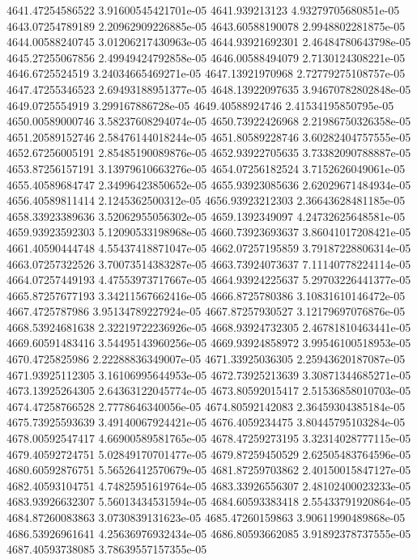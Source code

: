 {4641.47254586522 3.91600545421701e-05
4641.939213123 4.93279705680851e-05
4643.07254789189 2.20962909226885e-05
4643.60588190078 2.9948802281875e-05
4644.00588240745 3.01206217430963e-05
4644.93921692301 2.46484780643798e-05
4645.27255067856 2.49949424792858e-05
4646.00588494079 2.7130124308221e-05
4646.6725524519 3.24034665469271e-05
4647.13921970968 2.72779275108757e-05
4647.47255346523 2.69493188951377e-05
4648.13922097635 3.94670782802848e-05
4649.0725554919 3.299167886728e-05
4649.40588924746 2.41534195850795e-05
4650.00589000746 3.58237608294074e-05
4650.73922426968 2.21986750326358e-05
4651.20589152746 2.58476144018244e-05
4651.80589228746 3.60282404757555e-05
4652.67256005191 2.85485190089876e-05
4652.93922705635 3.73382090788887e-05
4653.87256157191 3.13979610663276e-05
4654.07256182524 3.7152626049061e-05
4655.40589684747 2.34996423850652e-05
4655.93923085636 2.62029671484934e-05
4656.40589811414 2.1245362500312e-05
4656.93923212303 2.36643628481185e-05
4658.33923389636 3.52062955056302e-05
4659.1392349097 4.24732625648581e-05
4659.93923592303 5.12090533198968e-05
4660.73923693637 3.86041017208421e-05
4661.40590444748 4.55437418871047e-05
4662.07257195859 3.79187228806314e-05
4663.07257322526 3.70073514383287e-05
4663.73924073637 7.11140778224114e-05
4664.07257449193 4.47553973717667e-05
4664.93924225637 5.29703226441377e-05
4665.87257677193 3.34211567662416e-05
4666.8725780386 3.10831610146472e-05
4667.4725787986 3.95134789227924e-05
4667.87257930527 3.12179697076876e-05
4668.53924681638 2.32219722236926e-05
4668.93924732305 2.46781810463441e-05
4669.60591483416 3.54495143960256e-05
4669.93924858972 3.99546100518953e-05
4670.4725825986 2.22288836349007e-05
4671.33925036305 2.25943620187087e-05
4671.93925112305 3.16106995644953e-05
4672.73925213639 3.30871344685271e-05
4673.13925264305 2.64363122045774e-05
4673.80592015417 2.51536858010703e-05
4674.47258766528 2.7778646340056e-05
4674.80592142083 2.36459304385184e-05
4675.73925593639 3.49140067924421e-05
4676.4059234475 3.80445795103284e-05
4678.00592547417 4.66900589581765e-05
4678.47259273195 3.32314028777115e-05
4679.40592724751 5.02849170701477e-05
4679.87259450529 2.62505483764596e-05
4680.60592876751 5.56526412570679e-05
4681.87259703862 2.40150015847127e-05
4682.40593104751 4.74825951619764e-05
4683.33926556307 2.48102400023233e-05
4683.93926632307 5.56013434531594e-05
4684.60593383418 2.55433791920864e-05
4684.87260083863 3.0730839131623e-05
4685.47260159863 3.90611990489868e-05
4686.53926961641 4.25636976932434e-05
4686.80593662085 3.91892378737555e-05
4687.40593738085 3.78639557157355e-05
}
